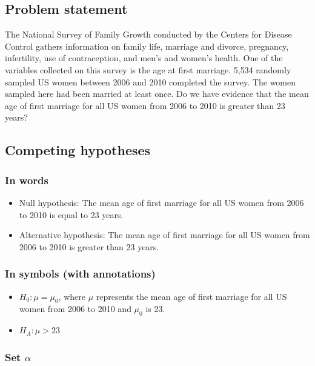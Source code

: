\documentclass[12pt,]{krantz}
\providecommand{\tightlist}{%
  \setlength{\itemsep}{0pt}\setlength{\parskip}{0pt}}
\theoremstyle{definition}
\theoremstyle{definition}
\theoremstyle{definition}
\theoremstyle{remark}
\begin{document}
\subsection{Problem statement}\label{problem-statement}

The National Survey of Family Growth conducted by the Centers for
Disease Control gathers information on family life, marriage and
divorce, pregnancy, infertility, use of contraception, and men's and
women's health. One of the variables collected on this survey is the age
at first marriage. 5,534 randomly sampled US women between 2006 and 2010
completed the survey. The women sampled here had been married at least
once. Do we have evidence that the mean age of first marriage for all US
women from 2006 to 2010 is greater than 23 years? \citep[Tweaked a bit
from][ {[}Chapter 4{]}]{isrs2014}

\subsection{Competing hypotheses}\label{competing-hypotheses}

\subsubsection*{In words}\label{in-words}


\begin{itemize}
\item
  Null hypothesis: The mean age of first marriage for all US women from
  2006 to 2010 is equal to 23 years.
\item
  Alternative hypothesis: The mean age of first marriage for all US
  women from 2006 to 2010 is greater than 23 years.
\end{itemize}

\subsubsection*{In symbols (with
annotations)}\label{in-symbols-with-annotations}


\begin{itemize}
\tightlist
\item
  \(H_0: \mu = \mu_{0}\), where \(\mu\) represents the mean age of first
  marriage for all US women from 2006 to 2010 and \(\mu_0\) is 23.
\item
  \(H_A: \mu > 23\)
\end{itemize}

\subsubsection*{\texorpdfstring{Set
\(\alpha\)}{Set \textbackslash{}alpha}}\label{set-alpha}
\end{document}
